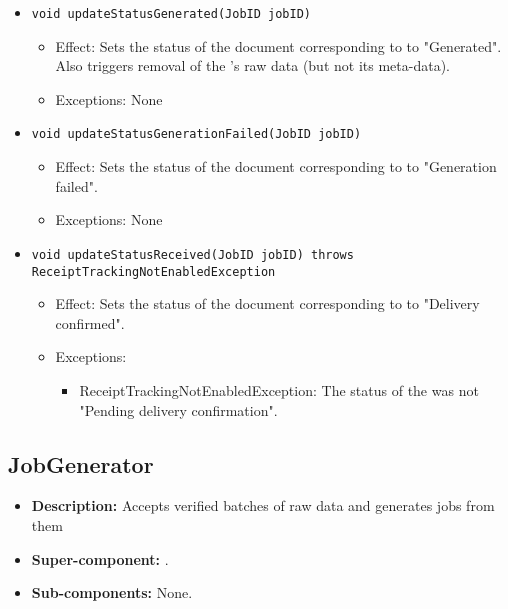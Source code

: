 \begin{itemize}
\begin{itemize}
		\item \texttt{void updateStatusGenerated(JobID jobID)}
		\begin{itemize}
            \item Effect: Sets the status of the document corresponding to  to "Generated". Also triggers removal of the 's raw data (but not its meta-data).
            \item Exceptions: None
        \end{itemize}

		\item \texttt{void updateStatusGenerationFailed(JobID jobID)}
		\begin{itemize}
            \item Effect: Sets the status of the document corresponding to  to "Generation failed".
            \item Exceptions: None
        \end{itemize}

		\item \texttt{void updateStatusReceived(JobID jobID) throws ReceiptTrackingNotEnabledException}
		\begin{itemize}
            \item Effect: Sets the status of the document corresponding to  to "Delivery confirmed".
            \item Exceptions:
			\begin{itemize}
				\item ReceiptTrackingNotEnabledException: The status of the  was not "Pending delivery confirmation".
			\end{itemize}
        \end{itemize}
    \end{itemize}
\end{itemize}

\subsection{JobGenerator} 
\begin{itemize}
	\item \textbf{Description:} Accepts verified batches of raw data and generates jobs from them
	\item \textbf{Super-component:} .
	\item \textbf{Sub-components:} None.
\end{itemize}

